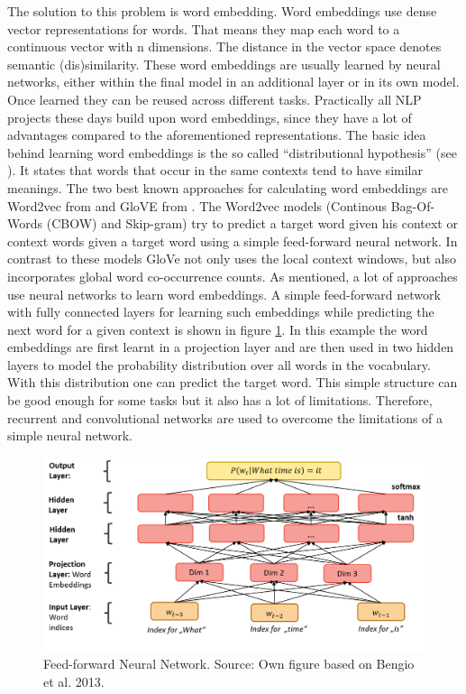 \documentclass[]{krantz}
\begin{document}
The solution to this problem is word embedding. Word embeddings use dense vector representations for words. That means they map each word to a continuous vector with n dimensions. The distance in the vector space denotes semantic (dis)similarity. These word embeddings are usually learned by neural networks, either within the final model in an additional layer or in its own model. Once learned they can be reused across different tasks. Practically all NLP projects these days build upon word embeddings, since they have a lot of advantages compared to the aforementioned representations.
The basic idea behind learning word embeddings is the so called ``distributional hypothesis'' (see \citet{Harris.1954}). It states that words that occur in the same contexts tend to have similar meanings. The two best known approaches for calculating word embeddings are Word2vec from \citet{Mikolov.2013c} and GloVE from \citet{Pennington.2014}. The Word2vec models (Continous Bag-Of-Words (CBOW) and Skip-gram) try to predict a target word given his context or context words given a target word using a simple feed-forward neural network. In contrast to these models GloVe not only uses the local context windows, but also incorporates global word co-occurrence counts.
As mentioned, a lot of approaches use neural networks to learn word embeddings. A simple feed-forward network with fully connected layers for learning such embeddings while predicting the next word for a given context is shown in figure \ref{fig:nnlm}. In this example the word embeddings are first learnt in a projection layer and are then used in two hidden layers to model the probability distribution over all words in the vocabulary. With this distribution one can predict the target word. This simple structure can be good enough for some tasks but it also has a lot of limitations. Therefore, recurrent and convolutional networks are used to overcome the limitations of a simple neural network.

\begin{figure}
\includegraphics[width=1\linewidth]{figures/01-00-deep-learning-for-nlp/01-01_nnlm} \caption{Feed-forward Neural Network. Source: Own figure based on Bengio et al. 2013.}\label{fig:nnlm}
\end{figure}
\end{document}
